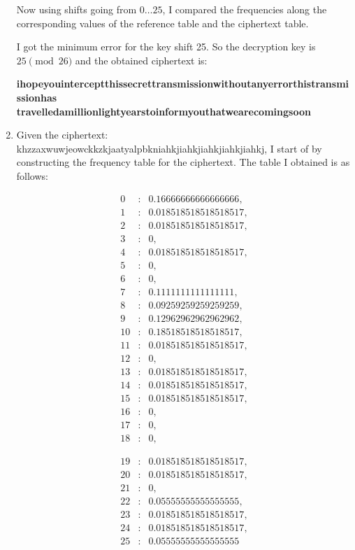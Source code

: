 \documentclass{ashoka-crypto}
\begin{document}
\begin{enumerate}[label=(\alph*)]
Now using shifts going from $0\dots 25$, I compared the frequencies along the corresponding values of the reference table and the ciphertext table.

I got the minimum error for the key shift 25. So the decryption key is $25 \pmod {26}$ and the obtained ciphertext is:

\textbf{ihopeyouinterceptthissecrettransmissionwithoutanyerrorthistransmissionhas}
\textbf{travelledamillionlightyearstoinformyouthatwearecomingsoon}

\item Given the ciphertext: khzzaxwuwjeowckkzkjaatyalpbkniahkjiahkjiahkjiahkjiahkj, I start of by constructing the frequency table for the ciphertext. The table I obtained is as follows:

\[
\begin{array}{rcl}
0  & : & 0.16666666666666666, \\
1  & : & 0.018518518518518517, \\
2  & : & 0.018518518518518517, \\
3  & : & 0, \\
4  & : & 0.018518518518518517, \\
5  & : & 0, \\
6  & : & 0, \\
7  & : & 0.1111111111111111, \\
8  & : & 0.09259259259259259, \\
9  & : & 0.12962962962962962, \\
10 & : & 0.18518518518518517, \\
11 & : & 0.018518518518518517, \\
12 & : & 0, \\
13 & : & 0.018518518518518517, \\
14 & : & 0.018518518518518517, \\
15 & : & 0.018518518518518517, \\
16 & : & 0, \\
17 & : & 0, \\
18 & : & 0,
\end{array}
\]

\[
\begin{array}{rcl}
19 & : & 0.018518518518518517, \\
20 & : & 0.018518518518518517, \\
21 & : & 0, \\
22 & : & 0.05555555555555555, \\
23 & : & 0.018518518518518517, \\
24 & : & 0.018518518518518517, \\
25 & : & 0.05555555555555555
\end{array}
\]
 

\end{enumerate}
\end{document}

